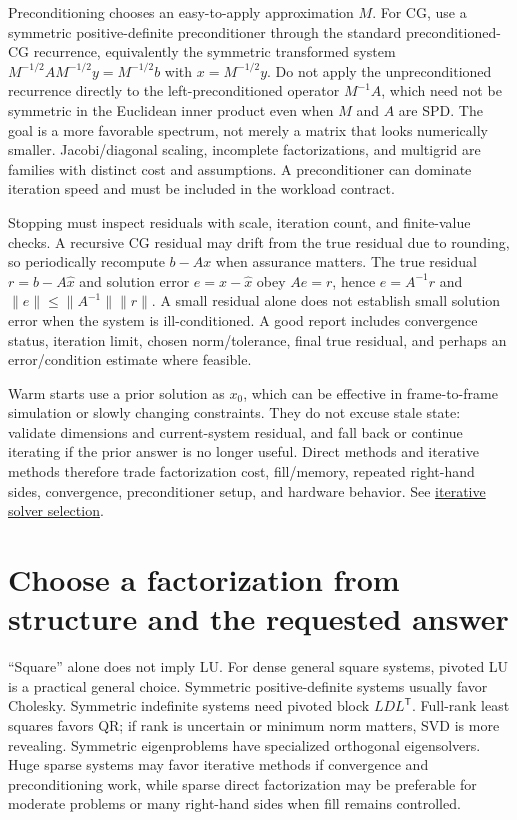 Preconditioning chooses an easy-to-apply approximation \(M\). For CG, use a symmetric positive-definite preconditioner through the standard preconditioned-CG recurrence, equivalently the symmetric transformed system \(M^{-1/2}AM^{-1/2}y=M^{-1/2}b\) with \(x=M^{-1/2}y\). Do not apply the unpreconditioned recurrence directly to the left-preconditioned operator \(M^{-1}A\), which need not be symmetric in the Euclidean inner product even when \(M\) and \(A\) are SPD. The goal is a more favorable spectrum, not merely a matrix that looks numerically smaller. Jacobi/diagonal scaling, incomplete factorizations, and multigrid are families with distinct cost and assumptions. A preconditioner can dominate iteration speed and must be included in the workload contract.

Stopping must inspect residuals with scale, iteration count, and finite-value checks. A recursive CG residual may drift from the true residual due to rounding, so periodically recompute \(b-Ax\) when assurance matters. The true residual \(r=b-A\hat x\) and solution error \(e=x-\hat x\) obey \(Ae=r\), hence \(e=A^{-1}r\) and \(\|e\|\le\|A^{-1}\|\|r\|\). A small residual alone does not establish small solution error when the system is ill-conditioned. A good report includes convergence status, iteration limit, chosen norm/tolerance, final true residual, and perhaps an error/condition estimate where feasible.

Warm starts use a prior solution as \(x_0\), which can be effective in frame-to-frame simulation or slowly changing constraints. They do not excuse stale state: validate dimensions and current-system residual, and fall back or continue iterating if the prior answer is no longer useful. Direct methods and iterative methods therefore trade factorization cost, fill/memory, repeated right-hand sides, convergence, preconditioner setup, and hardware behavior. See \hyperref[02-foundations-ii-ch038-sparse-storage-changes-the-cost-model]{iterative solver selection}.

\section{Choose a factorization from structure and the requested answer}\label{02-foundations-ii-ch038-choose-a-factorization-from-structure-and-the-requested-answer}

\hypertarget{02-foundations-ii-ch038-choose-a-factorization-from-structure-and-the-requested-answer}{}

``Square'' alone does not imply LU. For dense general square systems, pivoted LU is a practical general choice. Symmetric positive-definite systems usually favor Cholesky. Symmetric indefinite systems need pivoted block \(LDL^\mathsf T\). Full-rank least squares favors QR; if rank is uncertain or minimum norm matters, SVD is more revealing. Symmetric eigenproblems have specialized orthogonal eigensolvers. Huge sparse systems may favor iterative methods if convergence and preconditioning work, while sparse direct factorization may be preferable for moderate problems or many right-hand sides when fill remains controlled.

